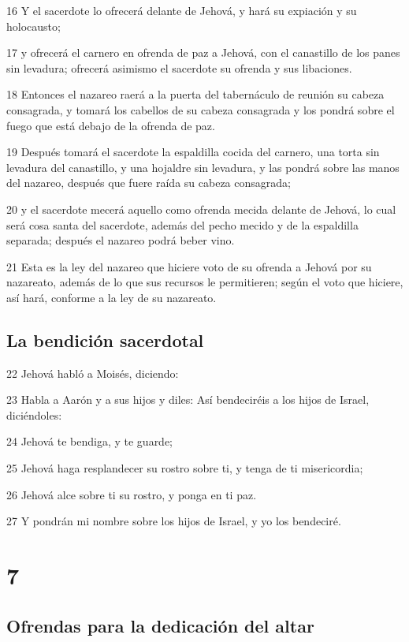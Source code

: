 \par 16 Y el sacerdote lo ofrecerá delante de Jehová, y hará su expiación y su holocausto;
\par 17 y ofrecerá el carnero en ofrenda de paz a Jehová, con el canastillo de los panes sin levadura; ofrecerá asimismo el sacerdote su ofrenda y sus libaciones.
\par 18 Entonces el nazareo raerá a la puerta del tabernáculo de reunión su cabeza consagrada, y tomará los cabellos de su cabeza consagrada y los pondrá sobre el fuego que está debajo de la ofrenda de paz.
\par 19 Después tomará el sacerdote la espaldilla cocida del carnero, una torta sin levadura del canastillo, y una hojaldre sin levadura, y las pondrá sobre las manos del nazareo, después que fuere raída su cabeza consagrada;
\par 20 y el sacerdote mecerá aquello como ofrenda mecida delante de Jehová, lo cual será cosa santa del sacerdote, además del pecho mecido y de la espaldilla separada; después el nazareo podrá beber vino.
\par 21 Esta es la ley del nazareo que hiciere voto de su ofrenda a Jehová por su nazareato, además de lo que sus recursos le permitieren; según el voto que hiciere, así hará, conforme a la ley de su nazareato.

\section*{La bendición sacerdotal}

\par 22 Jehová habló a Moisés, diciendo:
\par 23 Habla a Aarón y a sus hijos y diles: Así bendeciréis a los hijos de Israel, diciéndoles: 
\par 24 Jehová te bendiga, y te guarde; 
\par 25 Jehová haga resplandecer su rostro sobre ti, y tenga de ti misericordia; 
\par 26 Jehová alce sobre ti su rostro, y ponga en ti paz. 
\par 27 Y pondrán mi nombre sobre los hijos de Israel, y yo los bendeciré. 

\chapter{7}

\section*{Ofrendas para la dedicación del altar}


